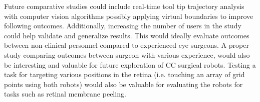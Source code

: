 \documentclass[letterpaper, 10 pt, conference]{ieeeconf}  %
\begin{document}
Future comparative studies could include real-time tool tip trajectory analysis with computer vision algorithms possibly applying virtual boundaries to improve following outcomes. Additionally, increasing the number of users in the study could help validate and generalize results. This would ideally evaluate outcomes between non-clinical personnel compared to experienced eye surgeons. 
A proper study comparing outcomes between surgeon with various experience, would also be interesting and valuable for future exploration of CC surgical robots. Testing a task for targeting various positions in the retina (i.e. touching an array of grid points using both robots) would also be valuable for evaluating the robots for tasks such as retinal membrane peeling.
\newline

\addtolength{\textheight}{-11cm}   %









\end{document}
